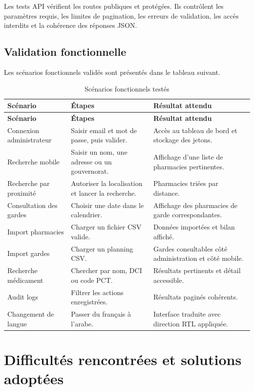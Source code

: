Les tests API vérifient les routes publiques et protégées. Ils contrôlent les paramètres requis, les limites
de pagination, les erreurs de validation, les accès interdits et la cohérence des réponses JSON.

\subsection{Validation fonctionnelle}

Les scénarios fonctionnels validés sont présentés dans le tableau suivant.

\begin{longtable}{L{4cm}L{5cm}L{5cm}}
    \caption{Scénarios fonctionnels testés}\\
    \toprule
    \textbf{Scénario} & \textbf{Étapes} & \textbf{Résultat attendu} \\
    \midrule
    \endfirsthead
    \toprule
    \textbf{Scénario} & \textbf{Étapes} & \textbf{Résultat attendu} \\
    \midrule
    \endhead
    Connexion administrateur & Saisir email et mot de passe, puis valider. & Accès au tableau de bord et stockage des jetons. \\
    Recherche mobile & Saisir un nom, une adresse ou un gouvernorat. & Affichage d'une liste de pharmacies pertinentes. \\
    Recherche par proximité & Autoriser la localisation et lancer la recherche. & Pharmacies triées par distance. \\
    Consultation des gardes & Choisir une date dans le calendrier. & Affichage des pharmacies de garde correspondantes. \\
    Import pharmacies & Charger un fichier CSV valide. & Données importées et bilan affiché. \\
    Import gardes & Charger un planning CSV. & Gardes consultables côté administration et côté mobile. \\
    Recherche médicament & Chercher par nom, DCI ou code PCT. & Résultats pertinents et détail accessible. \\
    Audit logs & Filtrer les actions enregistrées. & Résultats paginés cohérents. \\
    Changement de langue & Passer du français à l'arabe. & Interface traduite avec direction RTL appliquée. \\
    \bottomrule
\end{longtable}

\section{Difficultés rencontrées et solutions adoptées}

